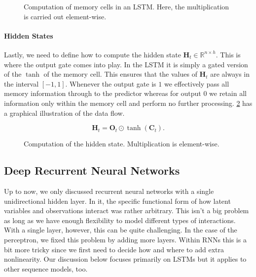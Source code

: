 \begin{figure}[hpt]
    \centering
    
    \caption{Computation of memory cells in an LSTM. Here, the multiplication is carried out element-wise.}
    \label{fig:lstm_2}
\end{figure}

\paragraph{Hidden States}

Lastly, we need to define how to compute the hidden state $\mathbf{H}_t \in \mathbb{R}^{n \times h}$. This is where the output gate comes into play. In the LSTM it is simply a gated version of the $\tanh$ of the memory cell. This ensures that the values of $\mathbf{H}_t$ are always in the interval $[-1, 1]$. Whenever the output gate is $1$ we effectively pass all memory information through to the predictor whereas for output $0$ we retain all information only within the memory cell and perform no further processing. \cref{fig:lstm_3} has a graphical illustration of the data flow.

$$\mathbf{H}_t = \mathbf{O}_t \odot \tanh(\mathbf{C}_t).$$

\begin{figure}[hpt]
    \centering
    
    \caption{Computation of the hidden state. Multiplication is element-wise.}
    \label{fig:lstm_3}
\end{figure}

\subsection{Deep Recurrent Neural Networks}

Up to now, we only discussed recurrent neural networks with a single unidirectional hidden layer. In it, the specific functional form of how latent variables and observations interact was rather arbitrary. This isn't a big problem as long as we have enough flexibility to model different types of interactions. With a single layer, however, this can be quite challenging. In the case of the perceptron, we fixed this problem by adding more layers. Within RNNs this is a bit more tricky since we first need to decide how and where to add extra nonlinearity. Our discussion below focuses primarily on LSTMs but it applies to other sequence models, too.

